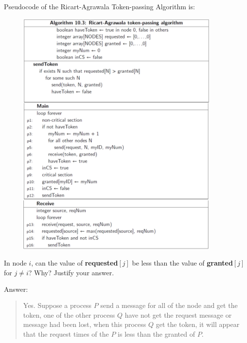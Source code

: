 \documentclass{article}
\begin{document}
\begin{Question} 
    Pseudocode of the Ricart-Agrawala Token-passing Algorithm is:
\begin{figure}[H]
    \centering 
    \includegraphics[width=0.9\textwidth]{DV_demand2}
\end{figure}

\clearpage
\begin{Subquestion}
    In node $i$, can the value of \textbf{requested$[j]$} be less than the value of \textbf{granted$[j]$} for $j \neq i$? Why? Justify your answer.
    
\begin{answer}
    Answer:
    \begin{quote}
        Yes. Suppose a process $P$ send a message for all of the node and get the token, one of the other process $Q$ have not get the request message or message had been lost, when this process $Q$ get the token, it will appear that the request times of the $P$ is less than the granted of $P$.\\
    \end{quote}
\end{answer}
\end{Subquestion}


\end{Question}
\end{document}
